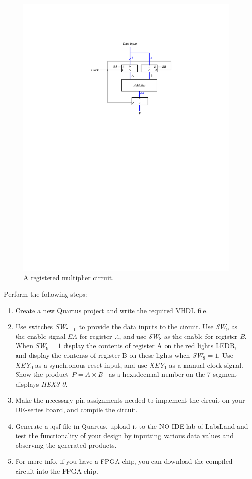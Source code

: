 \documentclass[epsfig,10pt,fullpage]{article}
\begin{document}
\begin{figure}[H]
\centerline{
\includegraphics{figures/registered_mult}}
\caption{A registered multiplier circuit.}
\label{fig:registered_mult}
\end{figure}

Perform the following steps:
\begin{enumerate}
\item Create a new Quartus project and write the required VHDL file.
\item Use switches {\it SW}$_{7-0}$ to provide the data inputs to the circuit. Use
{\it SW}$_9$ as the enable signal {\it EA} for register {\it A}, and use {\it SW}$_8$
as the enable for register {\it B}.  When {\it SW}$_9 = 1$ display the contents of
register A on the red lights LEDR, and display the contents of register B on these lights
when {\it SW}$_8 = 1$. Use {\it KEY}$_0$ as a synchronous reset input, and use 
{\it KEY}$_1$ as a manual clock signal.  Show the product~$P = A \times B$~ as a
hexadecimal number on the 7-segment displays {\it HEX3-0}.
\item Make the necessary pin assignments needed to implement the circuit on your
DE-series board, and compile the circuit.
\item Generate a .qsf file in Quartus, upload it to the NO-IDE lab of LabsLand and test the functionality of your design by inputting various data values and observing
the generated products.
\item For more info, if you have a FPGA chip, you can download the compiled circuit into the FPGA chip.
\end{enumerate}
\end{document}
